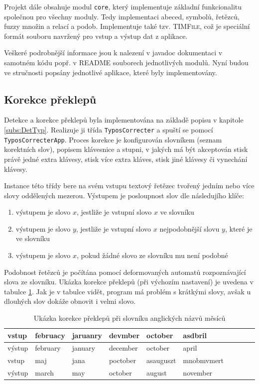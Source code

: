 Projekt dále obsahuje modul \verb|core|, který implementuje základní funkcionalitu společnou pro všechny moduly. Tedy implementaci abeced, symbolů, řetězců, fuzzy množin a relací a podob. Implementuje také tzv. \textsc{TIMFile}, což je speciální formát souboru navržený pro vstup a výstup dat z aplikace.

Veškeré podrobnější informace jsou k nalezení v javadoc dokumentaci v samotném kódu popř. v \textsc{README} souborech jednotlivých modulů. Nyní budou ve stručnosti popsány jednotlivé aplikace, které byly implementovány.

\subsection{Korekce překlepů}
Detekce a korekce překlepů byla implementována na základě popisu v kapitole \ref{subs:DetTyp}. Realizuje ji třída \verb|TyposCorrecter| a spuští se pomocí \verb|TyposCorrecterApp|. Proces korekce je konfigurován slovníkem (seznam korektních slov), popisem klávesnice a stupni, v jakých má být akceptován stisk právě jedné extra klávesy, stisk více extra kláves, stisk jiné klávesy či vynechání klávesy.

Instance této třídy bere na svém vstupu textový řetězec tvořený jedním nebo více slovy oddělených mezerou. Výstupem je posloupnost slov dle následujího klíče:
\begin{enumerate}
 \item výstupem je slovo $x$, jestliže je vstupní slovo $x$ ve slovníku
 \item výstupem je slovo $y$, jestliže je vstupní slovo $x$ nejpodobnější slovu $y$, které je ve slovníku
 \item výstupem je slovo $x$, pokud žádné slovo ze slovníku mu není podobné
\end{enumerate}

Podobnost řetězců je počítána pomocí deformovaných automatů rozpoznávající slova ze slovníku. Ukázka korekce překlepů (při výchozím nastavení) je uvedena v tabulce \ref{tab:TyposOut}. Jak je v tabulce vidět, program má problém s krátkými slovy, avšak u dlouhých slov dokáže obnovit i velmi  slovo.

\begin{table}
 \centering
  \begin{tabular}{|l||l|l|l|l|l|l|l|l|l|}
    \hline
    vstup 	& februacy & jaruanry & devmber  & october & asdbril	\\\hline
    výstup 	& february & january  & december & october & april	\\\hline
    \hline
    vstup 	& maj   & jana & poctober & asauguszt  & mnobmvmert	\\\hline
    výstup	& march & may  & october  & august     & november	\\\hline
  \end{tabular}

 \caption[Ukázka korekce překlepů]{Ukázka korekce překlepů při slovníku anglických názvů měsíců} \label{tab:TyposOut}
\end{table}

